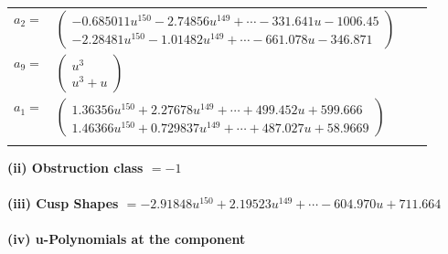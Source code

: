 \documentclass[1p]{elsarticle_modified}
\theoremstyle{definition}
\begin{document}
\begin{tabular}{m{7pt} m{180pt} m{7pt} m{180pt} }
\flushright $a_{2}=$&$\begin{pmatrix}-0.685011 u^{150}-2.74856 u^{149}+\cdots-331.641 u-1006.45\\-2.28481 u^{150}-1.01482 u^{149}+\cdots-661.078 u-346.871\end{pmatrix}$ \\
\flushright $a_{9}=$&$\begin{pmatrix}u^3\\u^3+u\end{pmatrix}$ \\
\flushright $a_{1}=$&$\begin{pmatrix}1.36356 u^{150}+2.27678 u^{149}+\cdots+499.452 u+599.666\\1.46366 u^{150}+0.729837 u^{149}+\cdots+487.027 u+58.9669\end{pmatrix}$\\&\end{tabular}
\flushleft \textbf{(ii) Obstruction class $= -1$}\\~\\
\flushleft \textbf{(iii) Cusp Shapes $= -2.91848 u^{150}+2.19523 u^{149}+\cdots-604.970 u+711.664$}\\~\\
\newpage\renewcommand{\arraystretch}{1}
\flushleft \textbf{(iv) u-Polynomials at the component}\newline \\
\end{document}
